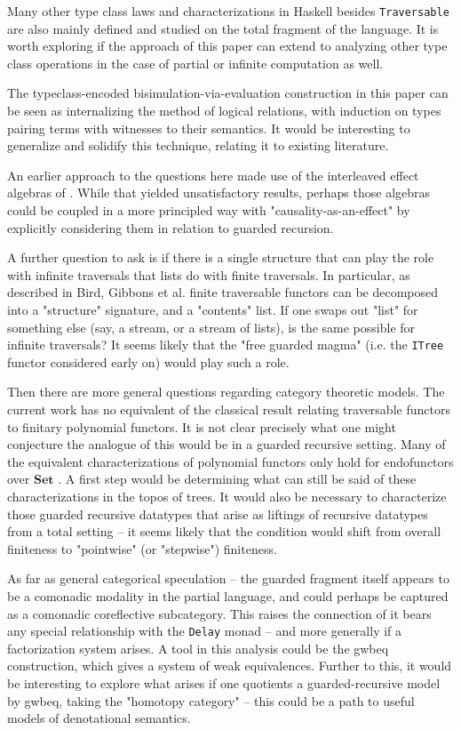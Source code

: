 \documentclass[sigplan,screen]{acmart}
\newcommand{\hs}{\texttt}
\begin{document}
Many other type class laws and characterizations in Haskell besides \hs{Traversable} are also mainly defined and studied on the total fragment of the language. It is worth exploring if the approach of this paper can extend to analyzing other type class operations in the case of partial or infinite computation as well.

The typeclass-encoded bisimulation-via-evaluation construction in this paper can be seen as internalizing the method of logical relations, with induction on types pairing terms with witnesses to their semantics. It would be interesting to generalize and solidify this technique, relating it to existing literature.

An earlier approach to the questions here made use of the interleaved effect algebras of \cite{interleaving, induction-with-effects}. While that yielded unsatisfactory results, perhaps those algebras could be coupled in a more principled way with "causality-as-an-effect" by explicitly considering them in relation to guarded recursion.

A further question to ask is if there is a single structure that can play the role with infinite traversals that lists do with finite traversals. In particular, as described in Bird, Gibbons et al. \cite{bird2013understanding} finite traversable functors can be decomposed into a "structure" signature, and a "contents" list. If one swaps out "list" for something else (say, a stream, or a stream of lists), is the same possible for infinite traversals? It seems likely that the "free guarded magma" (i.e. the \hs{ITree} functor considered early on) would play such a role.

Then there are more general questions regarding category theoretic models. The current work has no equivalent of the classical result relating traversable functors to finitary polynomial functors. It is not clear precisely what one might conjecture the analogue of this would be in a guarded recursive setting. Many of the equivalent characterizations of polynomial functors only hold for endofunctors over $\mathbf{Set}$ \cite{spivak2022reference}. A first step would be determining what can still be said of these characterizations in the topos of trees. It would also be necessary to characterize those guarded recursive datatypes that arise as liftings of recursive datatypes from a total setting -- it seems likely that the condition would shift from overall finiteness to "pointwise" (or "stepwise") finiteness.

As far as general categorical speculation -- the guarded fragment itself appears to be a comonadic modality in the partial language, and could perhaps be captured as a comonadic coreflective subcategory. This raises the connection of it bears any special relationship with the \hs{Delay} monad -- and more generally if a factorization system arises. A tool in this analysis could be the gwbeq construction, which gives a system of weak equivalences. Further to this, it would be interesting to explore what arises if one quotients a guarded-recursive model by gwbeq, taking the "homotopy category" -- this could be a path to useful models of denotational semantics.
\end{document}
